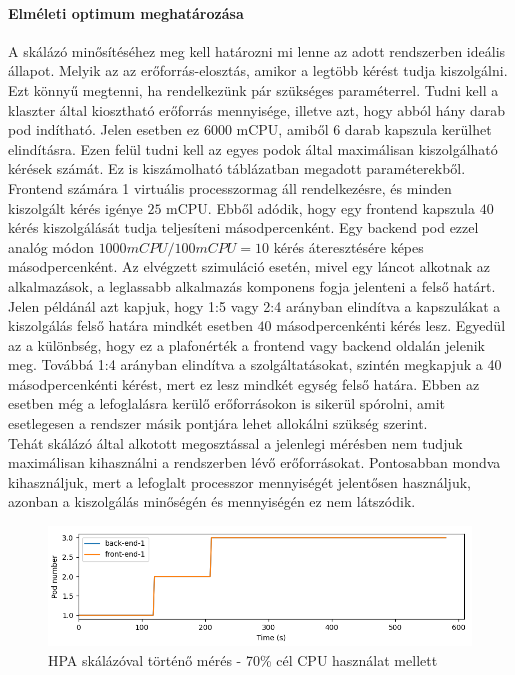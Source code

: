 \paragraph{Elméleti optimum meghatározása} 
A skálázó minősítéséhez meg kell határozni mi lenne az adott rendszerben ideális állapot.
Melyik az az erőforrás-elosztás, amikor a legtöbb kérést tudja kiszolgálni.
Ezt könnyű megtenni, ha rendelkezünk pár szükséges paraméterrel.
Tudni kell a klaszter által kiosztható erőforrás mennyisége, illetve azt, hogy abból hány darab pod indítható. Jelen esetben ez $6000$ mCPU, amiből $6$ darab kapszula kerülhet elindításra.
Ezen felül tudni kell az egyes podok által maximálisan kiszolgálható kérések számát. 
Ez is kiszámolható  táblázatban megadott paraméterekből. 
Frontend számára 1 virtuális processzormag áll rendelkezésre, és minden kiszolgált kérés igénye $25$ mCPU.
Ebből adódik, hogy egy frontend kapszula $40$ kérés kiszolgálását tudja teljesíteni másodpercenként. 
Egy backend pod ezzel analóg módon $1000mCPU / 100mCPU = 10$ kérés áteresztésére képes másodpercenként.
Az elvégzett szimuláció esetén, mivel egy láncot alkotnak az alkalmazások, a leglassabb alkalmazás komponens fogja jelenteni a felső határt.
Jelen példánál azt kapjuk, hogy 1:5 vagy 2:4 arányban elindítva a kapszulákat a kiszolgálás felső határa mindkét esetben $40$ másodpercenkénti kérés lesz.
Egyedül az a különbség, hogy ez a plafonérték a frontend vagy backend oldalán jelenik meg.
Továbbá 1:4 arányban elindítva a szolgáltatásokat, szintén megkapjuk a 40 másodpercenkénti kérést, mert ez lesz mindkét egység felső határa. 
Ebben az esetben még a lefoglalásra kerülő erőforrásokon is sikerül spórolni, amit esetlegesen a rendszer másik pontjára lehet allokálni szükség szerint. \\

Tehát skálázó által alkotott megosztással a jelenlegi mérésben nem tudjuk maximálisan kihasználni a rendszerben lévő erőforrásokat.
Pontosabban mondva kihasználjuk, mert a lefoglalt processzor mennyiségét jelentősen használjuk, azonban a kiszolgálás minőségén és mennyiségén ez nem látszódik.

\begin{figure}[!ht]
	\centering
	\includegraphics[width=150mm, keepaspectratio]{figures/HPA-scaling-in-the-same-time_label.png}
	\caption{HPA skálázóval történő mérés - 70\% cél CPU használat mellett}
	\label{fig:HPA-scaling-same-time}
\end{figure}

